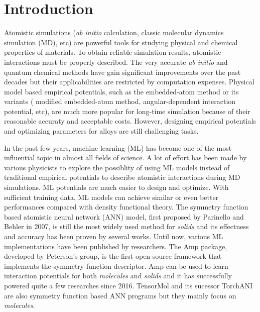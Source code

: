 \documentclass[final,1p,times]{elsarticle}
\begin{document}
\section{Introduction}

Atomistic simulations (\textit{ab initio} calculation, classic molecular 
dynamics simulation (MD), etc) are powerful tools for studying physical and 
chemical properties of materials. To obtain reliable simulation results, 
atomistic interactions must be properly described. The very accurate 
\textit{ab initio} and quantum chemical methods have gain significant 
improvements over the past decades but their applicabilities are restricted by 
computation expenses. Physical model based empirical potentials, such as the 
embedded-atom method\cite{eam-1,eam-2,eam-3,eam-4,eam-5} or its variants (
modified embedded-atom method\cite{eam-5,meam-1,meam-2,meam-3}, 
angular-dependent interaction potential\cite{adp-1,adp-2,adp-3}, etc), are much 
more popular for long-time simulation because of their reasonable accuraty and 
acceptable costs. 
However, designing empirical potentials and optimizing parameters for 
alloys are still challenging tasks\cite{eam-5, adp-2, SNAP_2018}. 

In the past few years, machine learning (ML) has become one of the most 
influential topic in almost all fields of science. A lot of effort has been made 
by various physicists to explore the possiblity of using ML models \textemdash 
instead of traditional empirical potentials \textemdash to describe atomistic 
interactions during MD simulations\cite{kCON,SchNet,DTNN,SNAP_2018,SNAP_Mo_2017,
ANI,TensorMol}. ML potentials are much easier to design and 
optimize. With sufficient training data, ML models can achieve similar or even 
better performances compared with density functional theory.
The symmetry function based atomistic neural network (ANN) model, first proposed 
by Parinello and Behler in 2007\cite{Behler,Behler2,Behler3,Behler4,Behler1}, 
is still the most widely used method for \textit{solids} and its effectness and 
accuracy has been proven by several 
works\cite{Behler-solids-lzp-1,Behler-alloy-1,Behler-alloy-2, Behler-alloy-3}.
Until now, various ML implementations\cite{AMP,ANI,TensorMol} have been 
published by researchers. The Amp\cite{AMP} package, developed by Peterson's 
group, is the first open-source framework that implements the symmetry function 
descriptor. Amp can be used to learn interaction potentials for both 
\textit{molecules} and \textit{solids} and it has successfully powered quite a 
few researches since 2016\cite{Amp-works-hammer,amp-work-1}. 
TensorMol\cite{TensorMol} and its sucessor TorchANI\cite{ANI} are also symmetry 
function based ANN programs but they mainly focus on \textit{molecules}. 
\end{document}
